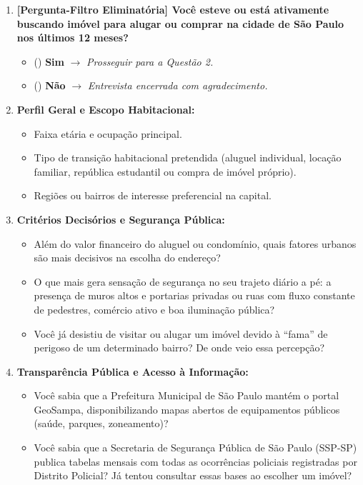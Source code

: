 \begin{enumerate}[leftmargin=*]


    \item \textbf{[Pergunta-Filtro Eliminatória] Você esteve ou está ativamente buscando imóvel para alugar ou comprar na cidade de São Paulo nos últimos 12 meses?}
    \begin{itemize}[leftmargin=1.5em]
        \item[] (\quad) \textbf{Sim} $\rightarrow$ \emph{Prosseguir para a Questão 2.}
        \item[] (\quad) \textbf{Não} $\rightarrow$ \emph{Entrevista encerrada com agradecimento.}
    \end{itemize}

    \item \textbf{Perfil Geral e Escopo Habitacional:}
    \begin{itemize}[leftmargin=1.5em]
        \item Faixa etária e ocupação principal.
        \item Tipo de transição habitacional pretendida (aluguel individual, locação familiar, república estudantil ou compra de imóvel próprio).
        \item Regiões ou bairros de interesse preferencial na capital.
    \end{itemize}

    \item \textbf{Critérios Decisórios e Segurança Pública:}
    \begin{itemize}[leftmargin=1.5em]
        \item Além do valor financeiro do aluguel ou condomínio, quais fatores urbanos são mais decisivos na escolha do endereço?
        \item O que mais gera sensação de segurança no seu trajeto diário a pé: a presença de muros altos e portarias privadas ou ruas com fluxo constante de pedestres, comércio ativo e boa iluminação pública?
        \item Você já desistiu de visitar ou alugar um imóvel devido à ``fama'' de perigoso de um determinado bairro? De onde veio essa percepção?
    \end{itemize}

    \item \textbf{Transparência Pública e Acesso à Informação:}
    \begin{itemize}[leftmargin=1.5em]
        \item Você sabia que a Prefeitura Municipal de São Paulo mantém o portal GeoSampa, disponibilizando mapas abertos de equipamentos públicos (saúde, parques, zoneamento)?
        \item Você sabia que a Secretaria de Segurança Pública de São Paulo (SSP-SP) publica tabelas mensais com todas as ocorrências policiais registradas por Distrito Policial? Já tentou consultar essas bases ao escolher um imóvel?
    \end{itemize}


\end{enumerate}
